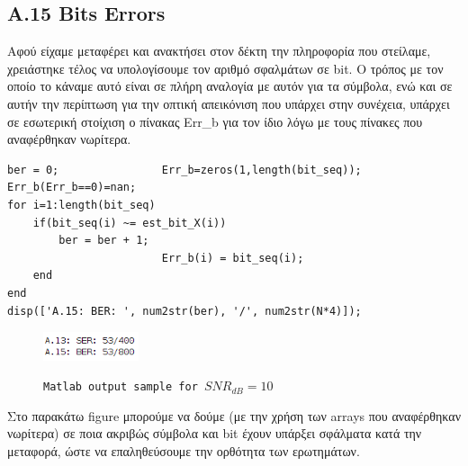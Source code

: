 \documentclass[11pt]{article}
\begin{document}
    \subsection*{A.15 Bits Errors}
    Αφού είχαμε μεταφέρει και ανακτήσει στον δέκτη την πληροφορία που στείλαμε, χρειάστηκε τέλος να υπολογίσουμε τον αριθμό σφαλμάτων σε bit.
    Ο τρόπος με τον οποίο το κάναμε αυτό είναι σε πλήρη αναλογία με αυτόν για τα σύμβολα, ενώ και σε αυτήν την περίπτωση για την οπτική απεικόνιση που υπάρχει στην συνέχεια, υπάρχει σε εσωτερική στοίχιση ο πίνακας Err\_b για τον ίδιο λόγω με τους πίνακες που αναφέρθηκαν νωρίτερα.
    
    \newpage
    \begin{lstlisting}[caption = {A.15 \texttt{Bits errors}}]
% A.15
ber = 0;                Err_b=zeros(1,length(bit_seq)); Err_b(Err_b==0)=nan;
for i=1:length(bit_seq)
    if(bit_seq(i) ~= est_bit_X(i))
        ber = ber + 1;
                        Err_b(i) = bit_seq(i); 
    end
end
disp(['A.15: BER: ', num2str(ber), '/', num2str(N*4)]); 
    \end{lstlisting}
    
    \begin{figure}[H]
        \centering
        \includegraphics[scale=0.5, width=0.25\textwidth]{img/A13_a15.png} \\
        \caption{\texttt{Matlab output sample for $SNR_{dB}=10$}}
    \end{figure}
    
    \par \noindent
    Στο παρακάτω figure μπορούμε να δούμε (με την χρήση των arrays που αναφέρθηκαν νωρίτερα) σε ποια ακριβώς σύμβολα και bit έχουν υπάρξει σφάλματα κατά την μεταφορά, ώστε να επαληθεύσουμε την ορθότητα των ερωτημάτων. 
    
\end{document}
